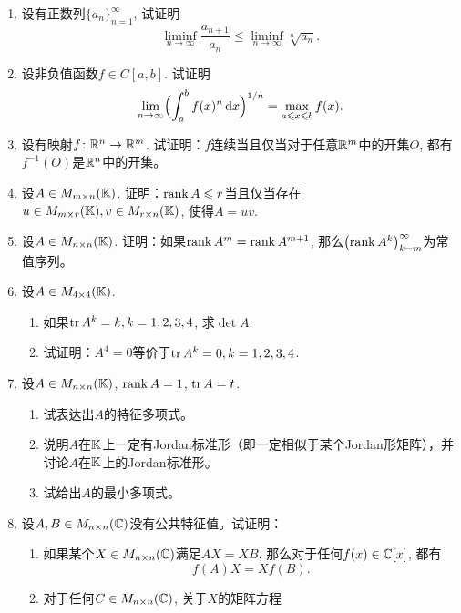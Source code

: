 \begin{enumerate}
    \item 设有正数列$\{a_n\}_{n=1}^{\infty}$, 试证明\begin{equation*}
        \liminf_{n\to\infty}\frac{a_{n+1}}{a_n}\leqslant\liminf_{n\to\infty}\sqrt[n]{a_n}.
    \end{equation*}
    \item 设非负值函数$f\in C[a,b]$. 试证明\begin{equation*}
        \lim_{n\to\infty}\Bigl(\int_a^b f(x)^n \mathop{}\!\mathrm{d} x\Bigr)^{1/n}=\max_{a\leqslant x\leqslant b}f(x).
    \end{equation*}
    \item 设有映射$f\colon\mathbb{R}^n\to\mathbb{R}^m$. 试证明：$f$连续当且仅当对于任意$\mathbb{R}^m$中的开集$O$, 都有$f^{-1}(O)$是$\mathbb{R}^n$中的开集。
    \item 设$A\in M_{m\times n}(\mathbb K)$. 证明：$\operatorname{rank} A\leqslant r$当且仅当存在$u\in M_{m\times r}(\mathbb K),v\in M_{r\times n}(\mathbb K)$, 使得$A=uv$.
    \item 设$A\in M_{n\times n}(\mathbb K)$. 证明：如果$\operatorname{rank} A^m=\operatorname{rank} A^{m+1}$, 那么$\left(\operatorname{rank} A^k\right)_{k=m}^\infty$为常值序列。
    \item 设$A\in M_{4\times 4}(\mathbb K)$. \begin{enumerate}
        \item 如果$\operatorname{tr} A^k=k,k=1,2,3,4$, 求$\det A$.
        \item 试证明：$A^4=0$等价于$\operatorname{tr} A^k=0,k=1,2,3,4$.
    \end{enumerate}
    \item 设$A\in M_{n\times n}(\mathbb K)$, $\operatorname{rank} A=1$, $\operatorname{tr} A=t$.
    \begin{enumerate}
        \item 试表达出$A$的特征多项式。
        \item 说明$A$在$\mathbb K$上一定有Jordan标准形（即一定相似于某个Jordan形矩阵），并讨论$A$在$\mathbb K$上的Jordan标准形。
        \item 试给出$A$的最小多项式。
    \end{enumerate}
    \item 设$A,B\in M_{n\times n}(\mathbb{C})$没有公共特征值。试证明：\begin{enumerate}
        \item 如果某个$X\in M_{n\times n}(\mathbb{C})$满足$AX=XB$, 那么对于任何$f(x)\in\mathbb{C}[x]$, 都有\begin{equation*}
            f(A)X=Xf(B).
        \end{equation*}
        \item 对于任何$C\in M_{n\times n}(\mathbb{C})$, 关于$X$的矩阵方程\begin{equation*}

\end{equation*}
\end{enumerate}
\end{enumerate}
